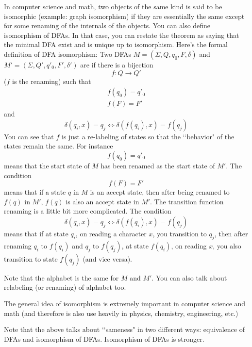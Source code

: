 In computer science and math, two objects of the same kind
is said to be isomorphic (example: graph isomorphism)
if they are essentially the same except for some renaming
of the internals of the objects.
You can also define isomorphism of DFAs.
In that case, you can restate the theorem as saying that the
minimal DFA exist and is unique up to isomorphism.
Here's the formal definition of DFA isomorphism:
Two DFAs
$M = (\Sigma, Q, q_0, F, \delta)$
and
$M' = (\Sigma, Q', q'_0, F', \delta')$
are  if there is a bijection
\[
f: Q \rightarrow Q'
\]
($f$ is the renaming)
such that
\begin{align*}
f(q_0) = q'_0 \\
f(F) = F' 
\end{align*}
and
\[
\delta(q_i, x) = q_j
\iff
\delta(f(q_i), x) = f(q_j)
\]
You can see that $f$ is just a re-labeling of states
so that the \lq\lq behavior" of the states remain the same.
For instance
\[
f(q_0) = q'_0
\]
means that the start state of $M$ has been renamed as the start state
of $M'$.
The condition
\[
f(F) = F'
\]
means that if a state $q$ in $M$ is an accept state,
then after being renamed to $f(q)$ in $M'$, $f(q)$ is also an accept
state in $M'$.
The transition function renaming is a little bit more complicated.
The condition
\[
\delta(q_i, x) = q_j
\iff
\delta(f(q_i), x) = f(q_j)
\]
means that if at state $q_i$, on reading a character $x$,
you transition to $q_j$, then after renaming
$q_i$ to $f(q_i)$
and
$q_j$ to $f(q_j)$,
at state $f(q_i)$, on reading $x$, you also transition to
state $f(q_j)$ (and vice versa).

Note that the alphabet is the same for $M$ and $M'$.
You can also talk about relabeling (or renaming) of alphabet too.

The general idea of isomorphism is extremely important in
computer science and math (and therefore is also use heavily in
physics, chemistry, engineering, etc.)

Note that the above talks about \lq\lq sameness" in two different
ways: equivalence of DFAs and isomorphism of DFAs.
Isomorphism of DFAs is stronger.


\newpage

